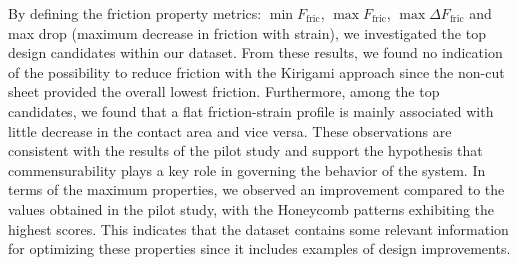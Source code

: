 By defining the friction property metrics: $\min F_{\text{fric}}$, $\max
F_{\text{fric}}$, $\max \Delta F_{\text{fric}}$ and max drop (maximum decrease
in friction with strain), we investigated the top design candidates within our
dataset. From these results, we found no indication of the possibility to
reduce friction with the Kirigami approach since the non-cut sheet provided the
overall lowest friction. Furthermore, among the top candidates, we found that a
flat friction-strain profile is mainly associated with little decrease in the
contact area and vice versa. These observations are consistent with the results
of the pilot study and support the hypothesis that commensurability plays a key
role in governing the behavior of the system. In terms of the maximum
properties, we observed an improvement compared to the values obtained in the
pilot study, with the Honeycomb patterns exhibiting the highest scores. This
indicates that the dataset contains some relevant information for optimizing these properties since it includes examples of design improvements.

